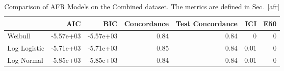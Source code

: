 \begin{table*}
\centering
\caption{Comparison of AFR Models on the Combined dataset. The metrics are defined in Sec.~\ref{afr}}
\label{tab:combined}
\begin{tabular}{lrrrrrr}
\toprule
 & AIC & BIC & Concordance & Test Concordance & ICI & E50 \\
\midrule
Weibull & -5.57e+03 & -5.57e+03 & 0.84 & 0.84 & 0 & 0 \\
Log Logistic & -5.71e+03 & -5.71e+03 & 0.85 & 0.84 & 0.01 & 0 \\
Log Normal & -5.85e+03 & -5.85e+03 & 0.84 & 0.84 & 0.01 & 0 \\
\bottomrule
\end{tabular}
\end{table*}
